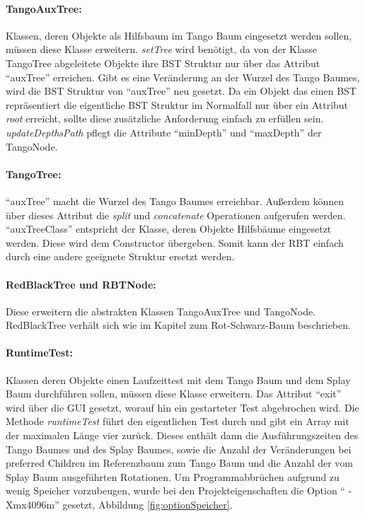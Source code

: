 \documentclass[a4paper,12pt]{article}
\begin{document}
\paragraph{TangoAuxTree:}
Klassen, deren Objekte als Hilfsbaum im Tango Baum eingesetzt werden sollen, müssen diese Klasse erweitern. \textit{setTree} wird benötigt, da von der Klasse TangoTree abgeleitete Objekte ihre BST Struktur nur über das Attribut \enquote{auxTree} erreichen. Gibt es eine Veränderung an der Wurzel des Tango Baumes, wird die BST Struktur von \enquote{auxTree} neu gesetzt. Da ein Objekt das einen BST repräsentiert die eigentliche BST Struktur im Normalfall nur über ein Attribut \textit{root} erreicht, sollte diese zusätzliche Anforderung einfach zu erfüllen sein. \textit{updateDepthsPath} pflegt die Attribute \enquote{minDepth} und \enquote{maxDepth} der TangoNode.

\paragraph{TangoTree:}
\enquote{auxTree} macht die Wurzel des Tango Baumes erreichbar. Außerdem können über dieses Attribut die \textit{split} und \textit{concatenate} Operationen aufgerufen werden. \enquote{auxTreeClass} entspricht der Klasse, deren  Objekte Hilfsbäume eingesetzt werden. Diese wird dem Constructor übergeben. Somit kann der RBT einfach durch eine andere geeignete Struktur ersetzt werden.

\paragraph{RedBlackTree und RBTNode:}
Diese erweitern die abstrakten Klassen TangoAuxTree und TangoNode. RedBlackTree verhält sich wie im Kapitel zum Rot-Schwarz-Baum  beschrieben. 

\paragraph{RuntimeTest:}
 Klassen deren Objekte einen Laufzeittest mit dem Tango Baum und dem Splay Baum durchführen sollen, müssen diese Klasse erweitern. Das Attribut \enquote{exit} wird über die GUI gesetzt, worauf hin ein gestarteter Test abgebrochen wird. Die Methode \textit{runtimeTest} führt den eigentlichen Test durch und gibt ein Array mit der maximalen Länge vier zurück. Dieses enthält dann die Ausführungszeiten des Tango Baumes und des Splay Baumes, sowie die Anzahl der Veränderungen bei preferred Children im Referenzbaum zum Tango Baum und die Anzahl der vom Splay Baum ausgeführten Rotationen. Um Programmabbrüchen aufgrund zu wenig Speicher vorzubeugen, wurde bei den Projekteigenschaften die Option \enquote{ -Xmx4096m} gesetzt, Abbildung \ref{fig:optionSpeicher}.
 
\end{document}
